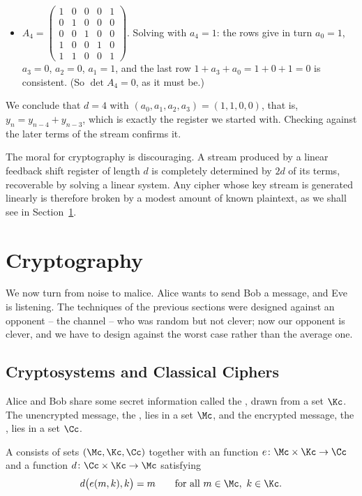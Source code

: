 \begin{example}
\begin{itemize}
		\item $A_4 = \begin{pmatrix}1&0&0&0&1\\0&1&0&0&0\\0&0&1&0&0\\1&0&0&1&0\\1&1&0&0&1\end{pmatrix}$. Solving with $a_4=1$: the rows give in turn $a_0 = 1$, $a_3 = 0$, $a_2 = 0$, $a_1 = 1$, and the last row $1+a_3+a_0 = 1+0+1 = 0$ is consistent. (So $\det A_4 = 0$, as it must be.)
	\end{itemize}
	We conclude that $d = 4$ with $(a_0,a_1,a_2,a_3) = (1,1,0,0)$, that is, $y_n = y_{n-4}+y_{n-3}$, which is exactly the register we started with. Checking against the later terms of the stream confirms it.
\end{example}

\begin{remark}
	The moral for cryptography is discouraging. A stream produced by a linear feedback shift register of length $d$ is completely determined by $2d$ of its terms, recoverable by solving a linear system. Any cipher whose key stream is generated linearly is therefore broken by a modest amount of known plaintext, as we shall see in Section~\ref{cc-sec:crypto}.
\end{remark}


\section{Cryptography}\label{cc-sec:crypto}

We now turn from noise to malice. Alice wants to send Bob a message, and Eve is listening. The techniques of the previous sections were designed against an opponent -- the channel -- who was random but not clever; now our opponent is clever, and we have to design against the worst case rather than the average one.

\subsection{Cryptosystems and Classical Ciphers}

Alice and Bob share some secret information called the , drawn from a set $\Kc$. The unencrypted message, the , lies in a set $\Mc$, and the encrypted message, the , lies in a set $\Cc$.

\begin{definition}[Cryptosystem]
	A  consists of sets $(\Mc,\Kc,\Cc)$ together with an  function $e\colon\Mc\times\Kc\to\Cc$ and a  function $d\colon\Cc\times\Kc\to\Mc$ satisfying
	$$d\bigl(e(m,k),k\bigr) = m \qquad \text{for all } m \in \Mc,\ k \in \Kc.$$
\end{definition}

